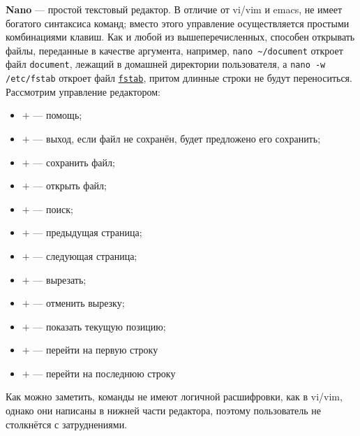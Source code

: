 \textbf{Nano} --- простой текстовый редактор. В отличие от vi/vim и emacs, не имеет богатого синтаксиса команд; вместо этого управление осуществляется простыми комбинациями клавиш. Как и любой из вышеперечисленных, способен открывать файлы, переданные в качестве аргумента, например, \texttt{nano \~{}/document} откроет файл \texttt{document}, лежащий в домашней директории пользователя, а \texttt{nano -w /etc/fstab} откроет файл \hyperref[fstab]{\texttt{fstab}}, притом длинные строки не будут переноситься.
Рассмотрим управление редактором:
\begin{itemize}
 \item \Ctrl$+$ --- помощь;
 \item \Ctrl$+$ --- выход, если файл не сохранён, будет предложено его сохранить;
 \item \Ctrl$+$ --- сохранить файл;
 \item \Ctrl$+$ --- открыть файл;
 \item \Ctrl$+$ --- поиск;
 \item \Ctrl$+$ --- предыдущая страница;
 \item \Ctrl$+$ --- следующая страница;
 \item \Ctrl$+$ --- вырезать;
 \item \Ctrl$+$ --- отменить вырезку;
 \item \Ctrl$+$ --- показать текущую позицию;
 \item \Alt$+$\keystroke{\textbackslash{}} --- перейти на первую строку
 \item \Alt$+$\keystroke{/} --- перейти на последнюю строку
\end{itemize}
Как можно заметить, команды не имеют логичной расшифровки, как в vi/vim, однако они написаны в нижней части редактора, поэтому пользователь не столкнётся с затруднениями.


